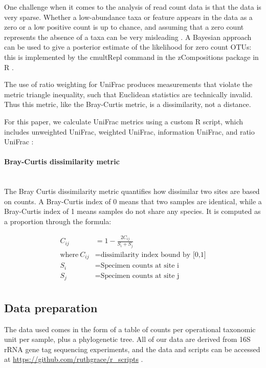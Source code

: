 \documentclass[10pt,letterpaper]{article}
\begin{document}
One challenge when it comes to the analysis of read count data is that the data is very sparse. Whether a low-abundance taxa or feature appears in the data as a zero or a low positive count is up to chance, and assuming that a zero count represents the absence of a taxa can be very misleading \cite{fernandes2013anova}. A Bayesian approach can be used to give a posterior estimate of the likelihood for zero count OTUs: this is implemented by the cmultRepl command in the zCompositions package in R \cite{palarea2015zcompositions}.

The use of ratio weighting for UniFrac produces measurements that violate the metric triangle inequality, such that Euclidean statistics are technically invalid. Thus this metric, like the Bray-Curtis metric, is a dissimilarity, not a distance.

For this paper, we calculate UniFrac metrics using a custom R script, which includes unweighted UniFrac, weighted UniFrac, information UniFrac, and ratio UniFrac \cite{ruth_unifrac_workshop}:

\paragraph{Bray-Curtis dissimilarity metric}\mbox{}\\
The Bray Curtis dissimilarity metric \cite{beals1984bray} quantifies how dissimilar two sites are based on counts. A Bray-Curtis index of 0 means that two samples are identical, while a Bray-Curtis index of 1 means samples do not share any species. It is computed as a proportion through the formula:

\begin{align*}
C_{ij} &= 1 - \frac{2C_{ij}}{S_{i} + S_{j}} \\
\text{where}~C_{ij}&= \text{dissimilarity index bound by [0,1]} \\
  S_{i} &= \text{Specimen counts at site i} \\
  S_{j} &= \text{Specimen counts at site j} \\
\end{align*}

\subsection{Data preparation}
The data used comes in the form of a table of counts per operational taxonomic unit per sample, plus a phylogenetic tree. All of our data are derived from 16S rRNA gene tag sequencing experiments, and the data and scripts can be accessed at \url{https://github.com/ruthgrace/r_scripts} \cite{r_scripts}.
\end{document}

